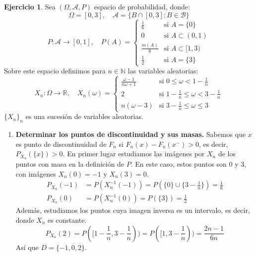 \documentclass{report}
\theoremstyle{remark}
\theoremstyle{remark}
\theoremstyle{remark}
\theoremstyle{definition}
\theoremstyle{definition}
\theoremstyle{definition}
\theoremstyle{definition}
\newtheorem*{exercise}{Ejercicio}
\begin{document}
\begin{exercise}
    Sea $(\Omega, \mathcal{A}, P)$ espacio de probabilidad, donde:
    $$\Omega = [0, 3], \quad \mathcal{A} = \{ B \cap [0, 3] : B \in \mathcal{B} \}$$
    $$P: \mathcal{A} \to [0, 1], \quad P(A) = \begin{cases}
            \frac{1}{6}    & \text{si } A = \{0\}        \\
            0              & \text{si } A \subset (0, 1) \\
            \frac{m(A)}{6} & \text{si } A \subset [1, 3) \\
            \frac{1}{2}    & \text{si } A = \{3\}
        \end{cases}$$
    Sobre este espacio definimos para $n \in \mathbb{N}$ las variables aleatorias:
    $$X_n: \Omega \to \mathbb{R}, \quad X_n(\omega) = \begin{cases}
            \frac{\omega - 1}{n\omega + 1} & \text{si } 0 \leq \omega < 1 - \frac{1}{n}               \\
            2                              & \text{si } 1 - \frac{1}{n} \leq \omega < 3 - \frac{1}{n} \\
            n(\omega - 3)                  & \text{si } 3 - \frac{1}{n} \leq \omega \leq 3
        \end{cases}$$
    $\{X_n\}_n$ es una sucesión de variables aleatorias.

    \begin{enumerate}
        \item \textbf{Determinar los puntos de discontinuidad y sus masas.}
              Sabemos que $x$ es punto de discontinuidad de $F_n$ si $F_n(x) - F_n(x^-) > 0$, es decir, $P_{X_n}(\{x\}) > 0$.
              En primer lugar estudiamos las imágenes por $X_n$ de los puntos con masa en la definición de $P$.
              En este caso, estos puntos son 0 y 3, con imágenes $X_n(0) = -1$ y $X_n(3) = 0$.
              \begin{align*}
                  P_{X_n}(-1) & = P(X_n^{-1}(-1)) = P(\{0\} \cup \{3-\frac{1}{n}\}) = \frac{1}{6} \\
                  P_{X_n}(0)  & = P(X_n^{-1}(0)) = P(\{3\}) = \frac{1}{2}
              \end{align*}
              Además, estudiamos los puntos cuya imagen inversa es un intervalo, es decir, donde $X_n$ es constante.
              $$P_{X_n}(2) = P([1-\frac{1}{n}, 3-\frac{1}{n})) = P([1, 3-\frac{1}{n})) = \frac{2n-1}{6n}$$
              Así que $D = \{-1, 0, 2\}$.


\end{enumerate}
\end{exercise}
\end{document}
